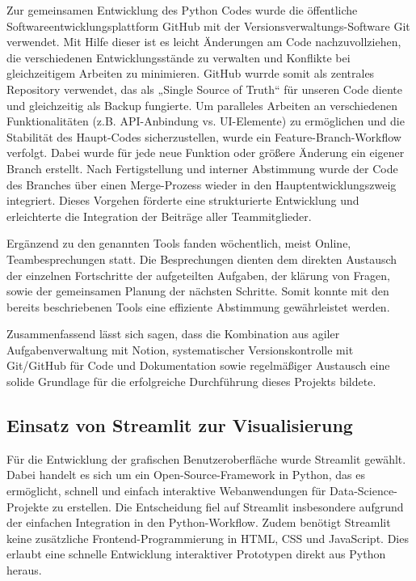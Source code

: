 Zur gemeinsamen Entwicklung des Python Codes wurde die öffentliche Softwareentwicklungsplattform GitHub mit der Versionsverwaltungs-Software Git verwendet. Mit Hilfe dieser ist es leicht Änderungen am Code nachzuvollziehen, die verschiedenen Entwicklungsstände zu verwalten und Konflikte bei gleichzeitigem Arbeiten zu minimieren. GitHub wurrde somit als zentrales Repository verwendet, das als „Single Source of Truth“ für unseren Code diente und gleichzeitig als Backup fungierte. Um paralleles Arbeiten an verschiedenen Funktionalitäten (z.B. API-Anbindung vs. UI-Elemente) zu ermöglichen und die Stabilität des Haupt-Codes sicherzustellen, wurde ein Feature-Branch-Workflow verfolgt. Dabei wurde für jede neue Funktion oder größere Änderung ein eigener Branch erstellt. Nach Fertigstellung und interner Abstimmung wurde der Code des Branches über einen Merge-Prozess wieder in den Hauptentwicklungszweig integriert. Dieses Vorgehen förderte eine strukturierte Entwicklung und erleichterte die Integration der Beiträge aller Teammitglieder.

Ergänzend zu den genannten Tools fanden wöchentlich, meist Online, Teambesprechungen statt. Die Besprechungen dienten dem direkten Austausch der einzelnen Fortschritte der aufgeteilten Aufgaben, der klärung von Fragen, sowie der gemeinsamen Planung der nächsten Schritte. Somit konnte mit den bereits beschriebenen Tools eine effiziente Abstimmung gewährleistet werden. 

Zusammenfassend lässt sich sagen, dass die Kombination aus agiler Aufgabenverwaltung mit Notion, systematischer Versionskontrolle mit Git/GitHub für Code und Dokumentation sowie regelmäßiger Austausch eine solide Grundlage für die erfolgreiche Durchführung dieses Projekts bildete.

\subsection{Einsatz von Streamlit zur Visualisierung}

Für die Entwicklung der grafischen Benutzeroberfläche wurde Streamlit gewählt. Dabei handelt es sich um ein Open-Source-Framework in Python, das es ermöglicht, schnell und einfach interaktive Webanwendungen für Data-Science-Projekte zu erstellen. Die Entscheidung fiel auf Streamlit insbesondere aufgrund der einfachen Integration in den Python-Workflow. Zudem benötigt Streamlit keine zusätzliche Frontend-Programmierung in HTML, CSS und JavaScript. Dies erlaubt eine schnelle Entwicklung interaktiver Prototypen direkt aus Python heraus. 

